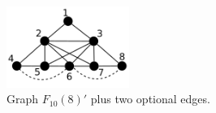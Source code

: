  \begin{figure}[htb]	
 \center%
 \includegraphics[width=4cm]{./img/f10-8opc.png}
 \caption{Graph $F_{10}(8)'$ plus two optional edges.}
\label{fig:f10-8opc}
\end{figure}  
 
